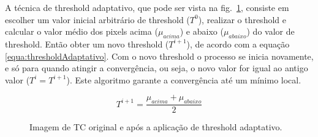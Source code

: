 A técnica de threshold adaptativo, que pode ser vista na fig.~\ref{fig:threshold}, consiste em escolher um valor inicial arbitrário de threshold ($T^0$), realizar o threshold e calcular o valor médio dos pixels acima ($\mu_{acima}$) e abaixo ($\mu_{abaixo}$) do valor de threshold. Então obter um novo threshold ($T^{i+1}$), de acordo com a equação~ \ref{equa:thresholdAdaptativo}. Com o novo threshold o processo se inicia novamente, e só para quando atingir a convergência, ou seja, o novo valor for igual ao antigo valor ($T^i = T^{i+1}$). Este algoritmo garante a convergência até um mínimo local.

\begin{equation}
 T^{i+1} = \frac{\mu_{acima}+\mu_{abaixo}}{2}
 \label{equa:thresholdAdaptativo}
\end{equation}

\begin{figure}[ht]
 \begin{center}
 \end{center}
 \caption{Imagem de TC original e após a aplicação de threshold adaptativo.}
 \label{fig:threshold}
\end{figure}

